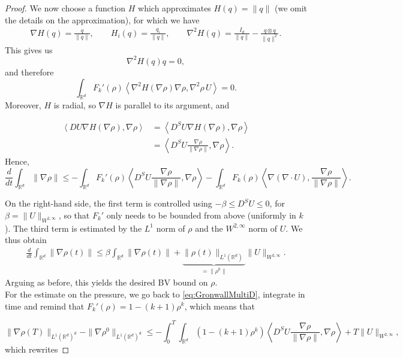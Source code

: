 \documentclass[11pt,twoside]{article}
\numberwithin{equation}{section}
\newcommand{\R}{\mathbb{R}}
\newcommand {\f}   {\frac}
\begin{document}
\begin{proof}
We now choose a function $H$ which approximates $H(q) = \|q\|$ (we omit the details on the approximation), for which we have
\begin{align*}
\nabla H(q) = \frac{q}{\|q\|},
\qquad
H_i(q) = \frac{q_i}{\|q\|},
\qquad
\nabla^2 H(q) = \frac{I_d}{\|q\|} - \frac{q \otimes q}{\|q\|^2}.
\end{align*}
This gives us
\[
\nabla^2 H(q) q = 0,
\]
and therefore
\[
\int_{\R^d} F_k'(\rho)
\left\langle \nabla^2 H(\nabla \rho)\nabla \rho,
\nabla^2 \rho\, U \right\rangle
= 0.
\]
Moreover, $H$ is radial, so $\nabla H$ is parallel to its argument, and

\[
\begin{aligned}
\left\langle DU \nabla H(\nabla \rho),\nabla \rho \right\rangle &= \left\langle D^SU \nabla H(\nabla \rho),\nabla \rho \right\rangle \\
&= \left\langle D^SU \f{\nabla \rho}{\| \nabla \rho \|},\nabla \rho \right\rangle.
\end{aligned}
\]
Hence,
\begin{equation}
\label{eq:GronwallMultiD}
\frac{d}{dt}\int_{\R^d} \|\nabla \rho\|
\le - \int_{\R^d} F_k'(\rho)
   \left\langle D^S U \frac{\nabla \rho}{\|\nabla \rho\|},
   \nabla \rho \right\rangle
 - \int_{\R^d} F_k(\rho)
   \left\langle \nabla(\nabla \cdot U),
   \frac{\nabla \rho}{\|\nabla \rho\|} \right\rangle.
\end{equation}

On the right-hand side, the first term is controlled using $-\beta \le D^S U \le 0$, for $\beta = \|U\|_{W^{2,\infty}}$, so that $F_k'$ only needs to be bounded from above (uniformly in $k$). The third term is estimated by the $L^1$ norm of $\rho$ and the $W^{2,\infty}$ norm of $U$. We thus obtain
\begin{align*}
\frac{d}{dt}\int_{\R^d} \|\nabla \rho(t)\|
\le \beta \int_{\R^d} \|\nabla \rho(t)\|
+ \underbrace{\|\rho(t)\|_{L^1(\R^d)}}_{=\|\rho^0\|}
  \|U\|_{W^{2,\infty}}.
\end{align*}
Arguing as before, this yields the desired BV bound on $\rho$. 
\\

For the estimate on the pressure, we go back to \eqref{eq:GronwallMultiD}, integrate in time and remind that $F_k'(\rho) = 1-(k+1)\rho^k$, which means that

\[
\|\nabla \rho(T)\|_{L^1(\R^d)^d}-\|\nabla \rho^0\|_{L^1(\R^d)^d}
\le - \int_0^T\int_{\R^d} (1-(k+1)\rho^k)
   \left\langle D^S U \frac{\nabla \rho}{\|\nabla \rho\|},
   \nabla \rho \right\rangle
 + T\|U\|_{W^{2,\infty}},
\]
which rewrites


\end{proof}
\end{document}
